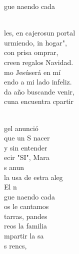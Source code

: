 \documentclass[12pt]{article}
\begin{document}
\begin{multicols*}{2}
\begin{cancion}
\begin{chorus}
	gue naendo cada   \\
	\end{chorus}%
	\jump\\
	les, en cajerosun portal\\
	urmiendo, in hogar",\\
	 con prisa omprar,\\
	creen  regalos  Navidad.\\
	mo Jesúserá en mí \\
	endo a mi lado infeliz.\\
	da año buscande venir,\\
	 cuna encuentra cpartir\\\jump\\
	\begin{chorus}%
	gel anunció \\
	que un S nacer\\
	y sin entender \\
	ecir "SI", Mara\\
	s  anun \\
	la usa de estra aleg\\
	El n\\
	gue naendo cada   \\
	os le cantamos \\
	tarras, pandes\\
	reos la familia \\
	mpartir la sa\\
	s rencs, \\

\end{chorus}
\end{cancion}
\end{multicols*}
\end{document}
